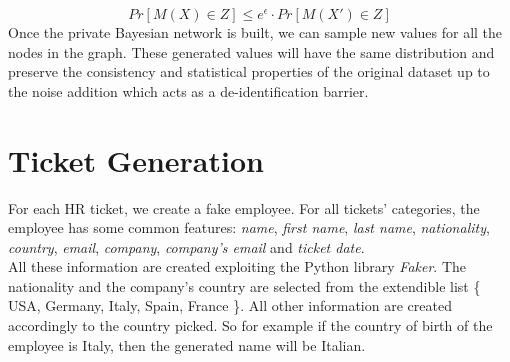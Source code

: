 \documentclass{article}
\begin{document}
\begin{equation}
    Pr[M(X) \in Z] \leq e^{\epsilon} \cdot Pr[M(X') \in Z]
\end{equation}
Once the private Bayesian network is built, we can sample new values for all the nodes in the graph. These generated values will have the same distribution and preserve the consistency and statistical properties of the original dataset up to the noise addition which acts as a de-identification barrier. 

    
\section{Ticket Generation}
For each HR ticket, we create a fake employee. For all tickets' categories, the employee has some common features: \textit{name}, \textit{first name}, \textit{last name}, \textit{nationality}, \textit{country}, \textit{email}, \textit{company}, \textit{company's email} and \textit{ticket date}.\\
All these information are created exploiting the Python library \textit{Faker}. The nationality and the company's country are selected from the extendible list \{ USA, Germany, Italy, Spain, France \}. All other information are created accordingly to the country picked. So for example if the country of birth of the employee is Italy, then the generated name will be Italian. \\
\end{document}
